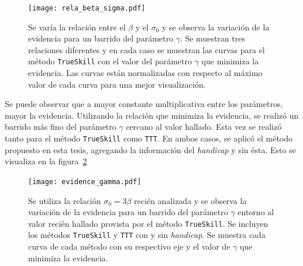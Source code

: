 \documentclass[11pt,twoside,spanish]{report} %
\begin{document}
\begin{figure}[H]
	\centering
	\texttt{[image: rela\_beta\_sigma.pdf]}
	\caption{Se var\'ia la relaci\'on entre el $\beta$ y el $\sigma_0$ y se observa la variaci\'on de la evidencia para un barrido del par\'ametro $\gamma$. Se muestran tres relaciones diferentes y en cada caso se muestran las curvas para el m\'etodo \texttt{TrueSkill} con el valor del par\'ametro $\gamma$ que  minimiza la evidencia. Las curvas est\'an normalizadas con respecto al m\'aximo valor de cada curva para una mejor visualizaci\'on.}
	\label{fig:relaBetaSigma}
\end{figure}


Se puede observar que a mayor constante multiplicativa entre los par\'ametros, mayor la evidencia.
Utilizando la relaci\'on que minimiza la evidencia, se realiz\'o un barrido m\'as fino del par\'ametro $\gamma$   \hspace{0.5mm} cercano al valor hallado.
Esta vez se realiz\'o tanto para el m\'etodo \texttt{TrueSkill} como \texttt{TTT}.
En ambos casos, se aplic\'o el m\'etodo propuesto en esta tesis, agregando la informaci\'on del \textit{handicap} y sin \'esta.
Esto se visualiza en la figura~\ref{fig:tttBetaSigma}

\begin{figure}[H]
	\centering
	\texttt{[image: evidence\_gamma.pdf]}
	\caption{Se utiliza la relaci\'on   $\sigma_0 = 3 \beta$ reci\'en analizada y se observa la variaci\'on de la evidencia para un barrido del par\'ametro $\gamma$ entorno al valor reci\'en hallado provista por el m\'etodo \texttt{TrueSkill}. Se incluyen los m\'etodos \texttt{TrueSkill} y \texttt{TTT} con y sin \textit{handicap}. Se muestra cada curva de cada m\'etodo con su respectivo eje y el valor de $\gamma$ que minimiza la evidencia.}
	\label{fig:tttBetaSigma}
\end{figure}
\end{document}

